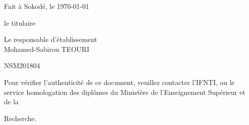 \documentclass[a4paper, landscape, 10pt]{article}
\begin{document}
Fait à Sokodé, le \today \\

\vspace{0.5cm}


\noindent
\begin{minipage}{0.49\textwidth}
	\begin{center}
		le titulaire\\
		\vspace{2.6cm}
	\end{center}
\end{minipage}\hfill
\begin{minipage}{0.49\textwidth}
	\begin{center}
		Le responsable d'établissement\\
		\vspace{2.6cm}
		Mohamed-Sabirou TEOURI
	\end{center}
\end{minipage}

\vspace{1.5cm}
\noindent
N\textdegree SM201804


\newpage


\vspace*{5cm}
\begin{center}
	\begin{minipage}{25cm}
		Pour vérifier l’authenticité de ce document, veuillez contacter l’IFNTI,
	ou le service homologation des diplômes du Ministère de l’Enseignement Supérieur et de la
	\end{minipage}
\end{center}
\vspace*{-0.7cm}
\begin{center}
	\begin{minipage}{25cm}
		\hspace{11.3cm}Recherche.
	\end{minipage}
\end{center}


\begin{center}
	
	
\end{center}
\end{document}
